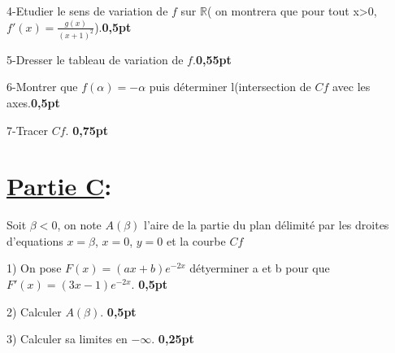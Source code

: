 \documentclass[12pt]{article}
\begin{document}
4-Etudier le sens de variation de $f$ sur $\mathbb{R}$( on montrera que pour tout x>0, $f'(x)=\frac{g(x)}{(x+1)^{2}}$).\textbf{0,5pt}

5-Dresser le tableau de variation de $f$.\textbf{0,55pt}

6-Montrer que $f(\alpha)=-\alpha$ puis déterminer l(intersection de $Cf$ avec les axes.\textbf{0,5pt}

7-Tracer $Cf$. \textbf{0,75pt}
\section*{\underline{Partie C}:}
Soit $\beta<0$, on note $A(\beta)$ l'aire de la partie du plan délimité par les droites d'equations $x=\beta$, $x=0$, $y=0$ et la courbe $Cf$

1) On pose $F(x)=(ax+b)e^{-2x}$ détyerminer a et b pour que $F'(x)=(3x-1)e^{-2x}$. \textbf{0,5pt}

2) Calculer $A(\beta)$. \textbf{0,5pt}

3) Calculer sa limites en $-\infty$. \textbf{0,25pt}
\end{document}
